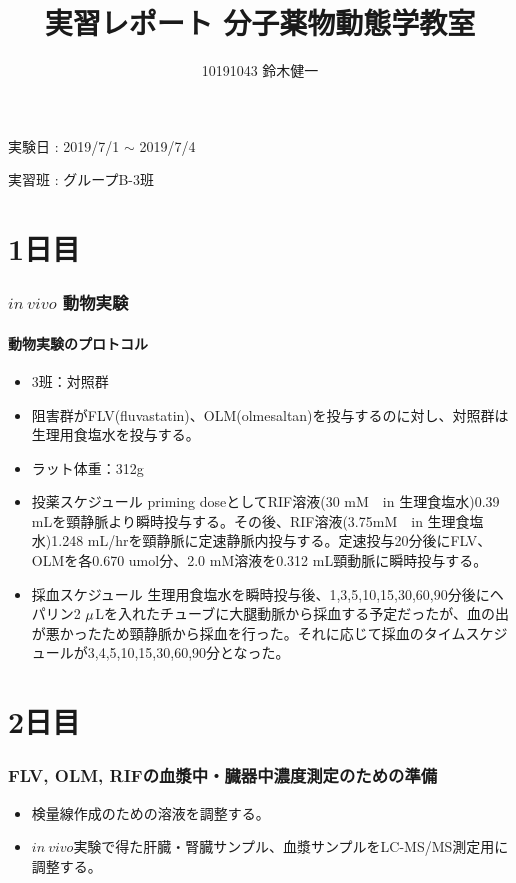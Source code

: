 \documentclass[a4paper,papersize,dvipdfmx]{jsarticle}
\begin{document}
\title{実習レポート 分子薬物動態学教室}
\author{10191043 鈴木健一}
\date{}
\maketitle





\begin{flushright}
実験日 : 2019/7/1 $\sim$ 2019/7/4

実習班 : グループB-3班
\end{flushright}


\part*{1日目}

\section*{$in \ vivo$ 動物実験}
\subsection*{動物実験のプロトコル}
\begin{itemize}
\item 3班：対照群
\item 阻害群がFLV(fluvastatin)、OLM(olmesaltan)を投与するのに対し、対照群は生理用食塩水を投与する。
\item ラット体重：312g
\item 投薬スケジュール
priming doseとしてRIF溶液(30 mM　in 生理食塩水)0.39 mLを頸静脈より瞬時投与する。その後、RIF溶液(3.75mM　in 生理食塩水)1.248 mL/hrを頸静脈に定速静脈内投与する。定速投与20分後にFLV、OLMを各0.670 umol分、2.0 mM溶液を0.312 mL頸動脈に瞬時投与する。
\item 採血スケジュール
生理用食塩水を瞬時投与後、1,3,5,10,15,30,60,90分後にヘパリン2 $\rm \mu$Lを入れたチューブに大腿動脈から採血する予定だったが、血の出が悪かったため頸静脈から採血を行った。それに応じて採血のタイムスケジュールが3,4,5,10,15,30,60,90分となった。


\end{itemize}
\part*{2日目}

\section*{FLV, OLM, RIFの血漿中・臓器中濃度測定のための準備}
\begin{itemize}
\item 検量線作成のための溶液を調整する。
\item $in \ vivo$実験で得た肝臓・腎臓サンプル、血漿サンプルをLC-MS/MS測定用に調整する。

\end{itemize}
\end{document}
